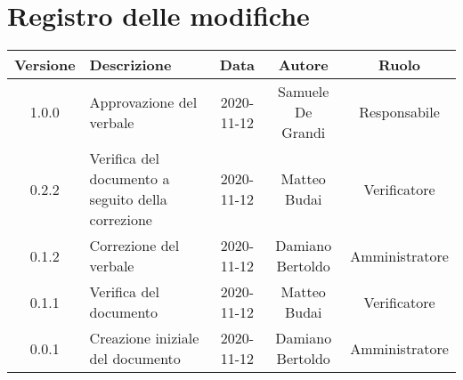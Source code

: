 \section*{Registro delle modifiche}

\begin{center}
	\begin{longtable}{|c|p{5cm}|c|c|c|}
	\hline
	\rowcolor{lighter-grayer}
	\textbf{Versione} & \textbf{Descrizione} & \textbf{Data} & \textbf{Autore} & \textbf{Ruolo} \\
	\hline
	\endfirsthead


	\hline
	1.0.0 & Approvazione del verbale & 2020-11-12 & Samuele De Grandi & Responsabile \\
	\hline
	0.2.2 & Verifica del documento a seguito della correzione & 2020-11-12 & Matteo Budai & Verificatore \\
	\hline
	0.1.2 & Correzione del verbale & 2020-11-12 & Damiano Bertoldo & Amministratore \\
	\hline
	0.1.1 & Verifica del documento & 2020-11-12 & Matteo Budai & Verificatore \\
	\hline
	0.0.1 & Creazione iniziale del documento & 2020-11-12 & Damiano Bertoldo & Amministratore \\
	\hline
	\end{longtable}
\end{center}
